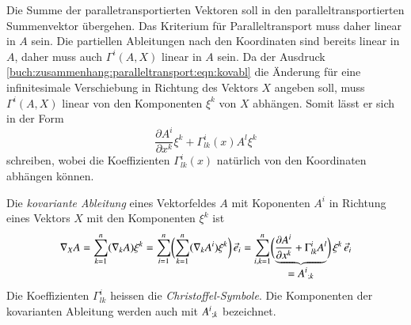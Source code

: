 Die Summe der paralletransportierten Vektoren soll in den
paralleltransportierten Summenvektor übergehen.
Das Kriterium für Paralleltransport muss daher linear in $A$ sein.
Die partiellen Ableitungen nach den Koordinaten sind bereits linear
in $A$, daher muss auch $\Gamma^i(A,X)$ linear in $A$ sein.
Da der Ausdruck
\eqref{buch:zusammenhang:paralleltransport:eqn:kovabl}
die Änderung für eine infinitesimale Verschiebung in Richtung
des Vektors $X$ angeben soll, muss $\Gamma^i(A,X)$ linear
von den Komponenten $\xi^k$ von $X$ abhängen.
Somit lässt er sich in der Form
\begin{equation}
\frac{\partial A^i}{\partial x^k}\xi^k
+
\Gamma^i_{lk}(x)A^l\xi^k
\end{equation}
schreiben, wobei die Koeffizienten $\Gamma^i_{lk}(x)$ natürlich
von den Koordinaten abhängen können.

\begin{definition}
\label{buch:zusammenhang:paralleltransport:kovabl:def:kovabl}
Die {\em kovariante Ableitung} eines Vektorfeldes $A$ mit Koponenten $A^i$
%
%
in Richtung eines Vektors $X$ mit den Komponenten $\xi^k$ ist
\begin{equation}
\nabla_X A
=
\sum_{k=1}^n
(\nabla_k A)
\xi^k
=
\sum_{i=1}^n
\biggl(
\sum_{k=1}^n
(
\nabla_k A^i
)
\xi^k
\biggr)
\,
\vec{e}_i
=
\sum_{i,k=1}^n
\biggl(
\underbrace{
\frac{\partial A^i}{\partial x^k}
+
\Gamma^{i}_{lk} A^l
}_{\displaystyle = A^i\mathstrut_{;k}}
\biggr)
\,
\xi^k
\,
\vec{e}_i
\label{buch:zusammenhang:paralleltransport:eqn:koverianteableitung}
\end{equation}
Die Koeffizienten $\Gamma^i_{lk}$ heissen die {\em Christoffel-Symbole}.
%
Die Komponenten der kovarianten Ableitung werden auch mit $A^i\mathstrut_{;k}$
bezeichnet.
\end{definition}

